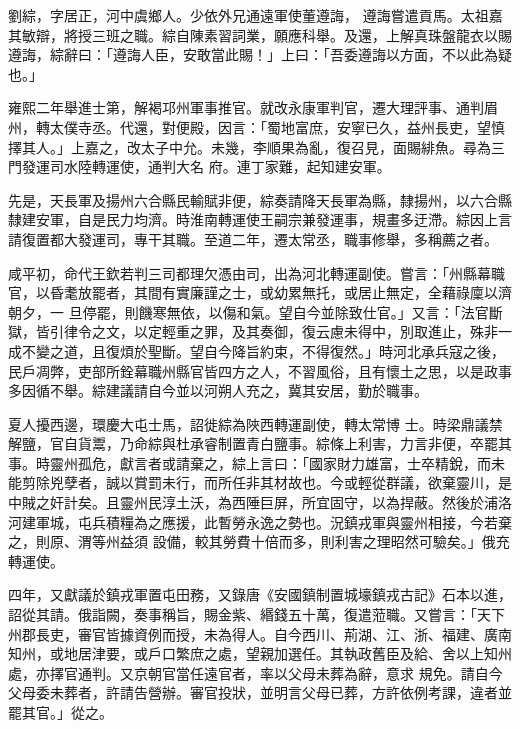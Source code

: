 \begin{pinyinscope}
 劉綜，字居正，河中虞鄉人。少依外兄通遠軍使董遵誨，
 遵誨嘗遣貢馬。太祖嘉其敏辯，將授三班之職。綜自陳素習詞業，願應科舉。及還，上解真珠盤龍衣以賜遵誨，綜辭曰：「遵誨人臣，安敢當此賜！」上曰：「吾委遵誨以方面，不以此為疑也。」



 雍熙二年舉進士第，解褐邛州軍事推官。就改永康軍判官，遷大理評事、通判眉州，轉太僕寺丞。代還，對便殿，因言：「蜀地富庶，安寧已久，益州長吏，望慎擇其人。」上嘉之，改太子中允。未幾，李順果為亂，復召見，面賜緋魚。尋為三門發運司水陸轉運使，通判大名
 府。連丁家難，起知建安軍。



 先是，天長軍及揚州六合縣民輸賦非便，綜奏請降天長軍為縣，隸揚州，以六合縣隸建安軍，自是民力均濟。時淮南轉運使王嗣宗兼發運事，規畫多迂滯。綜因上言請復置都大發運司，專干其職。至道二年，遷太常丞，職事修舉，多稱薦之者。



 咸平初，命代王欽若判三司都理欠憑由司，出為河北轉運副使。嘗言：「州縣幕職官，以昏耄放罷者，其間有實廉謹之士，或幼累無托，或居止無定，全藉祿廩以濟朝夕，一
 旦停罷，則饑寒無依，以傷和氣。望自今並除致仕官。」又言：「法官斷獄，皆引律令之文，以定輕重之罪，及其奏御，復云慮未得中，別取進止，殊非一成不變之道，且復煩於聖斷。望自今降旨約束，不得復然。」時河北承兵寇之後，民戶凋弊，吏部所銓幕職州縣官皆四方之人，不習風俗，且有懷土之思，以是政事多因循不舉。綜建議請自今並以河朔人充之，冀其安居，勤於職事。



 夏人擾西邊，環慶大屯士馬，詔徙綜為陜西轉運副使，轉太常博
 士。時梁鼎議禁解鹽，官自貨鬻，乃命綜與杜承睿制置青白鹽事。綜條上利害，力言非便，卒罷其事。時靈州孤危，獻言者或請棄之，綜上言曰：「國家財力雄富，士卒精銳，而未能剪除兇孽者，誠以賞罰未行，而所任非其材故也。今或輕從群議，欲棄靈川，是中賊之奸計矣。且靈州民淳土沃，為西陲巨屏，所宜固守，以為捍蔽。然後於浦洛河建軍城，屯兵積糧為之應援，此暫勞永逸之勢也。況鎮戎軍與靈州相接，今若棄之，則原、渭等州益須
 設備，較其勞費十倍而多，則利害之理昭然可驗矣。」俄充轉運使。



 四年，又獻議於鎮戎軍置屯田務，又錄唐《安國鎮制置城壕鎮戎古記》石本以進，詔從其請。俄詣闕，奏事稱旨，賜金紫、緡錢五十萬，復遣蒞職。又嘗言：「天下州郡長吏，審官皆據資例而授，未為得人。自今西川、荊湖、江、浙、福建、廣南知州，或地居津要，或戶口繁庶之處，望親加選任。其執政舊臣及給、舍以上知州處，亦擇官通判。又京朝官當任遠官者，率以父母未葬為辭，意求
 規免。請自今父母委未葬者，許請告營辦。審官投狀，並明言父母已葬，方許依例考課，違者並罷其官。」從之。




\end{pinyinscope}
